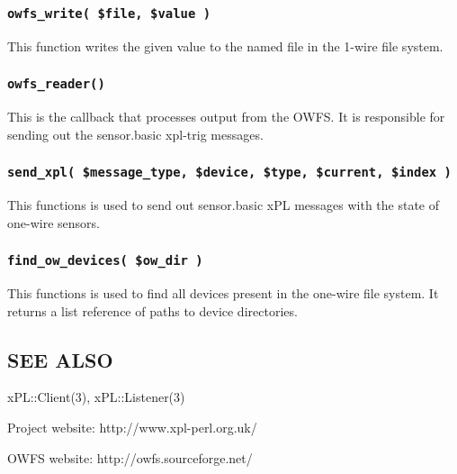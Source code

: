 \documentclass[12pt,a4paper]{article}
\begin{document}
\subsubsection*{\texttt{owfs\_write( \$file, \$value )}\label{xpl-owfs_owfs_write_file_value_}}


This function writes the given value to the named file in the 1-wire
file system.

\subsubsection*{\texttt{owfs\_reader()}\label{xpl-owfs_owfs_reader_}}


This is the callback that processes output from the OWFS.  It is
responsible for sending out the sensor.basic xpl-trig messages.

\subsubsection*{\texttt{send\_xpl( \$message\_type, \$device, \$type, \$current, \$index )}\label{xpl-owfs_send_xpl_message_type_device_type_current_index_}}


This functions is used to send out sensor.basic xPL messages with
the state of one-wire sensors.

\subsubsection*{\texttt{find\_ow\_devices( \$ow\_dir )}\label{xpl-owfs_find_ow_devices_ow_dir_}}


This functions is used to find all devices present in the one-wire
file system.  It returns a list reference of paths to device
directories.

\subsection*{SEE ALSO\label{xpl-owfs_SEE_ALSO}}


xPL::Client(3), xPL::Listener(3)



Project website: http://www.xpl-perl.org.uk/



OWFS website: http://owfs.sourceforge.net/
\end{document}
